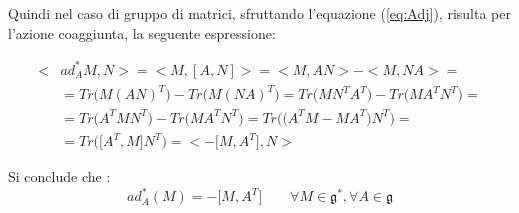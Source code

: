 \documentclass[11pt]{report}
\theoremstyle{plain}
\theoremstyle{definition}
\theoremstyle{remark}
\begin{document}
Quindi nel caso di gruppo di matrici, sfruttando l’equazione (\ref{eq:Adj}), risulta
per l’azione coaggiunta, la seguente espressione:

\begin{displaymath}\begin{split}
<& ad_{A}^{\ast}M, N>= < M , [A, N]> = < M , A N> - < M , N A> =\\ & = Tr \Bigr( M ( A N)^{T} \Bigr) - Tr \Bigr( M (N A)^{T} \Bigr) = Tr \Bigr( M N^{T} A^{T} \Bigr) - Tr \Bigr( M A^{T} N ^{T} \Bigr)= \\ & = Tr \Bigr(  A^{T} M N^{T} \Bigr) - Tr \Bigr( M A^{T} N ^{T} \Bigr) = Tr \Bigr( \bigr( A^{T} M - M A^{T} \bigr) N ^{T} \Bigr) = \\ &= Tr \Bigr( \bigr[ A^{T}, M \bigr] N ^{T} \Bigr) = < - \bigr[ M , A^{T} \bigr]  , N >
	\end{split}\end{displaymath}

Si conclude  che :
\begin{equation}
ad_{A}^{\ast} (M) = - \bigr[M,A^{T} \bigr]  \qquad \forall M \in \mathfrak{g}^{\ast} , \forall A \in \mathfrak{g}
\end{equation}


\clearpage
\end{document}
